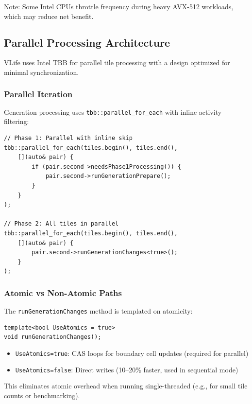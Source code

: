 \documentclass[11pt]{article}
\theoremstyle{definition}
\begin{document}
    Note: Some Intel CPUs throttle frequency during heavy AVX-512 workloads, which may reduce net benefit.

    \subsection{Parallel Processing Architecture}

    VLife uses Intel TBB for parallel tile processing with a design optimized for minimal synchronization.

    \subsubsection{Parallel Iteration}

    Generation processing uses \texttt{tbb::parallel\_for\_each} with inline activity filtering:

    \begin{lstlisting}
// Phase 1: Parallel with inline skip
tbb::parallel_for_each(tiles.begin(), tiles.end(),
    [](auto& pair) {
        if (pair.second->needsPhase1Processing()) {
            pair.second->runGenerationPrepare();
        }
    }
);

// Phase 2: All tiles in parallel
tbb::parallel_for_each(tiles.begin(), tiles.end(),
    [](auto& pair) {
        pair.second->runGenerationChanges<true>();
    }
);
    \end{lstlisting}

    \subsubsection{Atomic vs Non-Atomic Paths}

    The \texttt{runGenerationChanges} method is templated on atomicity:

    \begin{lstlisting}
template<bool UseAtomics = true>
void runGenerationChanges();
    \end{lstlisting}

    \begin{itemize}
        \item \texttt{UseAtomics=true}: CAS loops for boundary cell updates (required for parallel)
        \item \texttt{UseAtomics=false}: Direct writes (10--20\% faster, used in sequential mode)
    \end{itemize}

    This eliminates atomic overhead when running single-threaded (e.g., for small tile counts or benchmarking).
\end{document}
